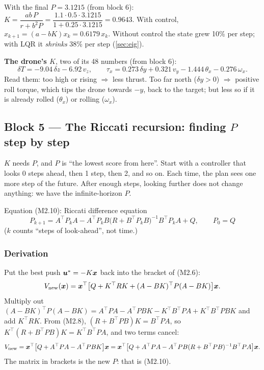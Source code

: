 \begin{toy}
With the final $P=3.1215$ (from block 6): $K=\dfrac{ab\,P}{r+b^2P}=\dfrac{1.1\cdot0.5\cdot3.1215}{1+0.25\cdot3.1215}=0.9643$.
With control, $x_{k+1}=(a-bK)x_k=0.6179\,x_k$. Without control the state grew 10\% per step; with LQR it
\emph{shrinks} 38\% per step (\cref{sec:eig}).

\textbf{The drone's $K$}, two of its 48 numbers (from block 6):
\[
\delta T=-9.04\,\delta z-6.92\,v_z,\qquad
\tau_x=0.273\,\delta y+0.321\,v_y-1.444\,\theta_x-0.276\,\omega_x .
\]
Read them: too high or rising $\Rightarrow$ less thrust. Too far north ($\delta y>0$) $\Rightarrow$ positive roll torque, which
tips the drone towards $-y$, back to the target; but less so if it is already rolled ($\theta_x$) or rolling ($\omega_x$).
\end{toy}

\subsection{Block 5 --- The Riccati recursion: finding $P$ step by step}
\label{sec:m2b5}

\begin{idea}
$K$ needs $P$, and $P$ is ``the lowest score from here''. Start with a controller that looks 0 steps ahead, then 1 step,
then 2, and so on. Each time, the plan sees one more step of the future. After enough steps, looking further does not
change anything: we have the infinite-horizon $P$.
\end{idea}

\begin{eqbox}{Equation (M2.10): Riccati difference equation}
\begin{equation}
  P_{k+1}=A^\top P_kA-A^\top P_kB\big(R+B^\top P_kB\big)^{-1}B^\top P_kA+Q,\qquad P_0=Q \tag{M2.10}
\end{equation}
($k$ counts ``steps of look-ahead'', not time.)
\end{eqbox}

\subsubsection*{Derivation}
Put the best push $\bm{u}^*=-K\bm{x}$ back into the bracket of (M2.6):
\[
V_{\text{new}}(\bm{x})=\bm{x}^\top\big[Q+K^\top RK+(A-BK)^\top P(A-BK)\big]\bm{x} .
\]
Multiply out $(A-BK)^\top P(A-BK)=A^\top PA-A^\top PBK-K^\top B^\top PA+K^\top B^\top PBK$ and add $K^\top RK$. From (M2.8),
$(R+B^\top PB)K=B^\top PA$, so $K^\top(R+B^\top PB)K=K^\top B^\top PA$, and two terms cancel:
\[
V_{\text{new}}=\bm{x}^\top\big[Q+A^\top PA-A^\top PBK\big]\bm{x}=\bm{x}^\top\big[Q+A^\top PA-A^\top PB(R+B^\top PB)^{-1}B^\top PA\big]\bm{x} .
\]
The matrix in brackets is the new $P$: that is (M2.10).

